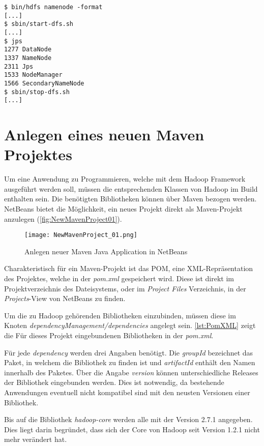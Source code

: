 \begin{lstlisting}[caption=Testen der Konfiguration, label=lis:TestenDerKonf]
$ bin/hdfs namenode -format
[...]
$ sbin/start-dfs.sh
[...]
$ jps
1277 DataNode
1337 NameNode
2311 Jps
1533 NodeManager
1566 SecondaryNameNode
$ sbin/stop-dfs.sh
[...]
\end{lstlisting}


\section{Anlegen eines neuen Maven Projektes}
Um eine Anwendung zu Programmieren, welche mit dem Hadoop Framework ausgeführt werden soll, müssen die entsprechenden Klassen von Hadoop im Build enthalten sein. Die benötigten Bibliotheken können über \gls{Maven} bezogen werden. \gls{NetBeans} bietet die Möglichkeit, ein neues Projekt direkt als \gls{Maven}-Projekt anzulegen (\autoref{fig:NewMavenProject01}).

\begin{figure}[h]
	\texttt{[image: NewMavenProject\_01.png]}
	\caption{Anlegen neuer Maven Java Application in NetBeans}
	\label{fig:NewMavenProject01}
\end{figure}

Charakteristisch für ein \gls{Maven}-Projekt ist das \ac{POM}, eine XML-Repräsentation des Projektes, welche in der \textit{pom.xml} gespeichert wird. Diese ist direkt im Projektverzeichnis des Dateisystems, oder im \textit{Project Files} Verzeichnis, in der \textit{Projects}-View von \gls{NetBeans} zu finden.

Um die zu Hadoop gehörenden Bibliotheken einzubinden, müssen diese im Knoten \textit{dependencyManagement/dependencies} angelegt sein. \autoref{lst:PomXML} zeigt die Für dieses Projekt eingebundenen Bibliotheken in der \textit{pom.xml}.

Für jede \textit{dependency} werden drei Angaben benötigt. Die \textit{groupId} bezeichnet das Paket, in welchem die Bibliothek zu finden ist und \textit{artifactId} enthält den Namen innerhalb des Paketes. Über die Angabe \textit{version} können unterschiedliche Releases der Bibliothek eingebunden werden. Dies ist notwendig, da bestehende Anwendungen eventuell nicht kompatibel sind mit den neusten Versionen einer Bibliothek.

Bis auf die Bibliothek \textit{hadoop-core} werden alle mit der Version 2.7.1 angegeben. Dies liegt darin begründet, dass sich der Core von Hadoop seit Version 1.2.1 nicht mehr verändert hat. \\

